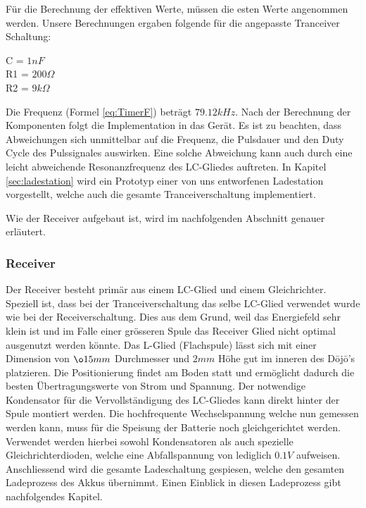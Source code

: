 Für die Berechnung der effektiven Werte, müssen die esten Werte angenommen werden. Unsere Berechnungen ergaben folgende für die angepasste Tranceiver Schaltung:

\begin{center}
C = $1nF$\\
R1 = $200\Omega$\\
R2 = $9k\Omega$\\
\end{center}
 
Die Frequenz (Formel \ref{eq:TimerF}) beträgt  $79.12kHz$. Nach der Berechnung der Komponenten folgt die Implementation in das Gerät. Es ist zu beachten, dass Abweichungen sich unmittelbar auf die Frequenz, die Pulsdauer und den Duty Cycle des Pulssignales auswirken. Eine solche Abweichung kann auch durch eine leicht abweichende Resonanzfrequenz des LC-Gliedes auftreten. In Kapitel \ref{sec:ladestation} wird ein Prototyp einer von uns entworfenen Ladestation vorgestellt, welche auch die gesamte Tranceiverschaltung implementiert.

Wie der Receiver aufgebaut ist, wird im nachfolgenden Abschnitt genauer erläutert.

\subsubsection*{Receiver}
Der Receiver besteht primär aus einem LC-Glied und einem Gleichrichter. Speziell ist, dass bei der Tranceiverschaltung das selbe LC-Glied verwendet wurde wie bei der Receiverschaltung. Dies aus dem Grund, weil das Energiefeld sehr klein ist und im Falle einer grösseren Spule das Receiver Glied nicht optimal ausgenutzt werden könnte. Das L-Glied (Flachspule) lässt sich mit einer Dimension von $\o 15mm$ Durchmesser und $2mm$ Höhe gut im inneren des Dōjō’s platzieren. Die Positionierung findet am Boden statt und ermöglicht dadurch die besten Übertragungswerte von Strom und Spannung. Der notwendige Kondensator für die Vervollständigung des LC-Gliedes kann direkt hinter der Spule montiert werden. Die hochfrequente Wechselspannung welche nun gemessen werden kann, muss für die Speisung der Batterie noch gleichgerichtet werden. Verwendet werden hierbei sowohl Kondensatoren als auch spezielle Gleichrichterdioden, welche eine Abfallspannung von lediglich $0.1V$ aufweisen. Anschliessend wird die gesamte Ladeschaltung gespiesen, welche den gesamten Ladeprozess des Akkus übernimmt. Einen Einblick in diesen Ladeprozess gibt nachfolgendes Kapitel.
